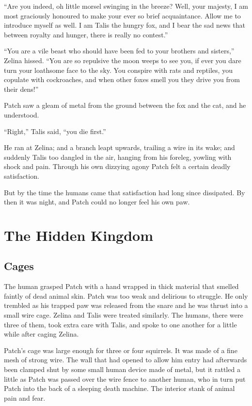 \documentclass[12pt]{memoir}
\begin{document}
“Are you indeed, oh little morsel swinging in the breeze? Well, your
majesty, I am most graciously honoured to make your ever so brief
acquaintance. Allow me to introduce myself as well. I am Talis the
hungry fox, and I bear the sad news that between royalty and hunger,
there is really no contest.”

“You are a vile beast who should have been fed to your brothers and
sisters,” Zelina hissed. “You are so repulsive the moon weeps to see
you, if ever you dare turn your loathsome face to the sky. You
conspire with rats and reptiles, you copulate with cockroaches, and
when other foxes smell you they drive you from their dens!”

Patch saw a gleam of metal from the ground between the fox and the
cat, and he understood.

“Right,” Talis said, “you die first.”

He ran at Zelina; and a branch leapt upwards, trailing a wire in its
wake; and suddenly Talis too dangled in the air, hanging from his
foreleg, yowling with shock and pain. Through his own dizzying agony
Patch felt a certain deadly satisfaction.

But by the time the humans came that satisfaction had long since
dissipated. By then it was night, and Patch could no longer feel his
own paw.


\chapter{The Hidden Kingdom}

\section{Cages}

The human grasped Patch with a hand wrapped in thick material that
smelled faintly of dead animal skin. Patch was too weak and delirious
to struggle. He only trembled as his trapped paw was released from the
snare and he was thrust into a small wire cage. Zelina and Talis were
treated similarly. The humans, there were three of them, took extra
care with Talis, and spoke to one another for a little while after
caging Zelina.

Patch’s cage was large enough for three or four squirrels. It was made
of a fine mesh of strong wire. The wall that had opened to allow him
entry had afterwards been clamped shut by some small human device made
of metal, but it rattled a little as Patch was passed over the wire
fence to another human, who in turn put Patch into the back of a
sleeping death machine. The interior stank of animal pain and fear.
\end{document}
